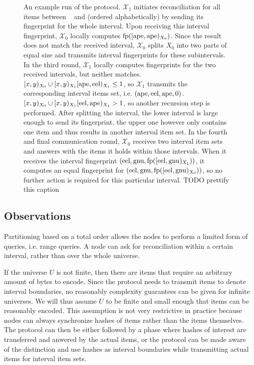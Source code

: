\begin{figure*}
\caption{
An example run of the protocol. $\mathcal{X}_1$ initiates reconciliation for all items between \examplea~ and \examplei (ordered alphabetically) by sending its fingerprint for the whole interval.
Upon receiving this interval fingerprint, $\mathcal{X}_0$ locally computes $\operatorname{fp}([{\mathrm{ape}},{\mathrm{ape}})_{X_0})$. Since the result does not match the received interval, $\mathcal{X}_0$ splits $X_0$ into two parts of equal size and transmits interval fingerprints for these subintervals.
In the third round, $\mathcal{X}_1$ locally computes fingerprints for the two received intervals, but neither matches. $[{x},{y})_{X_0} \cup [{x},{y})_{X_1}{[{\mathrm{ape}},{\mathrm{eel}})_{X_1}} \leq 1$, so $\mathcal{X}_1$ transmits the corresponding interval items set, i.e. $({\mathrm{ape}}, {\mathrm{eel}}, {\mathrm{ape}}, {0})$. $[{x},{y})_{X_0} \cup [{x},{y})_{X_1}{[{\mathrm{eel}},{\mathrm{ape}})_{X_1}} > 1$, so another recursion step is performed. After splitting the interval, the lower interval is large enough to send its fingerprint, the upper one however only contains one item and thus results in another interval item set.
In the fourth and final communication round, $\mathcal{X}_0$ receives two interval item sets and answers with the items it holds within those intervals. When it receives the interval fingerprint $({\mathrm{eel}}, {\mathrm{gnu}}, {\operatorname{fp}([{\mathrm{eel}},{\mathrm{gnu}})_{X_1})})$, it computes an equal fingerprint for $({\mathrm{eel}}, {\mathrm{gnu}}, {\operatorname{fp}([{\mathrm{eel}},{\mathrm{gnu}})_{X_0})})$, so no further action is required for this particular interval. TODO prettify this caption
}

\label{simple-set-reconciliation-example}
\end{figure*}

\subsection{Observations}

Partitioning based on a total order allows the nodes to perform a limited form of queries, i.e. range queries. A node can ask for reconciliation within a certain interval, rather than over the whole universe.

If the universe $U$ is not finite, then there are items that require an arbitrary amount of bytes to encode. Since the protocol needs to transmit items to denote interval boundaries, no reasonably complexity guarantees can be given for infinite universes. We will thus assume $U$ to be finite and small enough that items can be reasonably encoded. This assumption is not very restrictive in practice because nodes can always synchronize hashes of items rather than the items themselves. The protocol can then be either followed by a phase where hashes of interest are transferred and anwered by the actual items, or the protocol can be made aware of the distinction and use hashes as interval boundaries while transmitting actual items for interval item sets.

